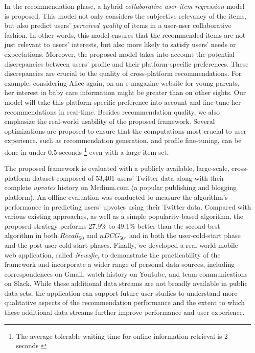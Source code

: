 \documentclass[conference]{IEEEtran}
\begin{document}
In the recommendation phase, a hybrid \textit{collaborative user-item regression} model is proposed. This model not only considers the subjective relevancy of the items, but also predict users' \textit{perceived quality} of items in a user-user collaborative fashion. In other words, this model ensures that the recommended items are not just relevant to users' interests, but also more likely to satisfy users' needs or expectations. Moreover, the proposed model takes into account the potential discrepancies between users' profile and their platform-specific preferences. These discrepancies are crucial to the quality of cross-platform recommendations. For example, considering Alice again, on an e-magazine website for young parents, her interest in baby care information might be greater than on other sights. Our model will take this platform-specific preference into account and fine-tune her recommendations in real-time. Besides recommendation quality, we also emphasize the real-world usability of the proposed framework. Several optimizations are proposed to ensure that the computations most crucial to user-experience, such as recommendation generation, and profile fine-tuning, can be done in under 0.5 seconds \footnote{The average tolerable waiting time for online information retrieval is 2 seconds \cite{nah2004study}} even with a large item set. 

The proposed framework is evaluated with a publicly available, large-scale, cross-platform dataset composed of 53,401 users' Twitter data along with their complete \textit{upvotes} history on Medium.com (a popular publishing and blogging platform). An offline evaluation was conducted to measure the algorithm's performance in predicting users' upvotes using their Twitter data. Compared with various existing approaches, as well as a simple popularity-based algorithm, the proposed strategy performs 27.9\%  to 49.1\%  better than the second best algorithm in both $Recall_{50}$ and $nDCG_{50}$, and in both the user-cold-start phase and the post-user-cold-start phases. Finally, we developed a real-world mobile-web application, called \textit{Newsfie},  to demonstrate the practicability of the framework and incorporate a wider range of personal data sources, including correspondences on Gmail, watch history on Youtube, and team communications on Slack. While these additional data streams are not broadly available in public data sets, the application can support future user studies to understand more qualitative aspects of the recommendation performance and the extent to which these additional data streams further improve performance and user experience.
\end{document}
